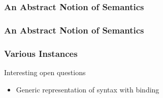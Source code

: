 \documentclass[xetex, mathserif, serif]{beamer}
\begin{document}
  \begin{frame}\frametitle{An Abstract Notion of Semantics}
  \end{frame}

  \begin{frame}\frametitle{An Abstract Notion of Semantics}
  \end{frame}

  \begin{frame}\frametitle{Various Instances}
  \end{frame}


  \begin{frame}{Interesting open questions}
    \begin{itemize}
      \item Generic representation of syntax with binding
    \end{itemize}
  \end{frame}
\end{document}
